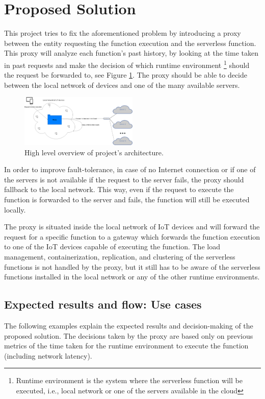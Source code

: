 \documentclass[conference]{IEEEtran}
\begin{document}
\section{Proposed Solution}

This project tries to fix the aforementioned problem by
introducing a proxy between the entity requesting the function execution and the
serverless function. This proxy will analyze each function's past history, by
looking at the time taken in past requests and make the decision of which runtime
environment \footnote{Runtime environment is the system where the serverless function will be executed, i.e., local network or one of the servers available in the cloud} should the request be forwarded to, see Figure
\ref{fig:request_func_high_level_diagram}. The proxy should be able to decide
between the local network of devices and one of the many available servers.

\begin{figure}[ht]
  \centering
  \includegraphics[width=0.5\textwidth]{diss-high-level-diagram.png}
  \caption{High level overview of project's architecture.}
  \label{fig:request_func_high_level_diagram}
\end{figure}

In order to improve fault-tolerance, in case of no Internet connection or if
one of the servers is not available if the request to the server fails, the proxy
should fallback to the local network. This way, even if the request to execute the function is forwarded to the server and fails, the function will still be executed locally.

The proxy is situated inside the local network of IoT devices and will forward the
request for a specific function to a gateway which forwards the function execution to
one of the IoT devices capable of executing the function. The load management,
containerization, replication, and clustering of the serverless functions is not
handled by the proxy, but it still has to be aware of the serverless functions
installed in the local network or any of the other runtime environments.

\subsection{Expected results and flow: Use cases}
\label{overview:usecases}
The following examples explain the expected results and decision-making of the
proposed solution. The decisions taken by the proxy are based only on previous
metrics of the time taken for the runtime environment to execute the function
(including network latency).
\end{document}
